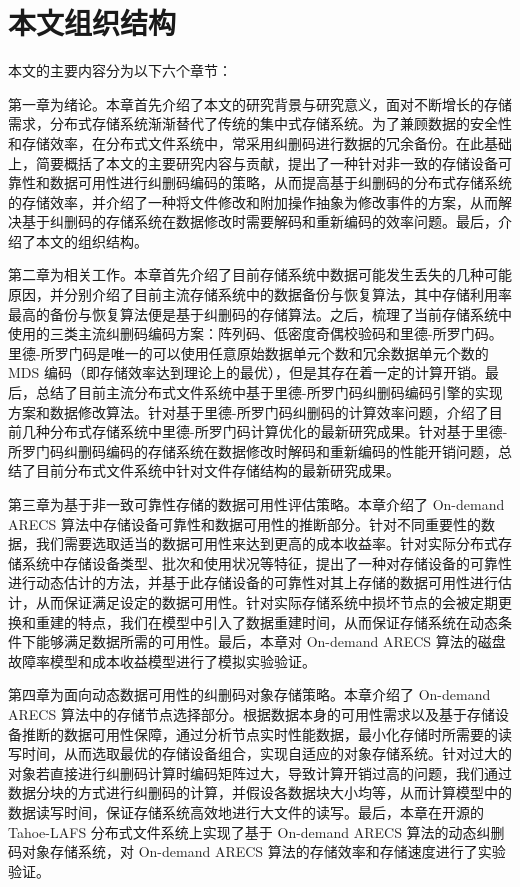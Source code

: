 \section{本文组织结构}
本文的主要内容分为以下六个章节：

第一章为绪论。本章首先介绍了本文的研究背景与研究意义，面对不断增长的存储需求，分布式存储系统渐渐替代了传统的集中式存储系统。为了兼顾数据的安全性和存储效率，在分布式文件系统中，常采用纠删码进行数据的冗余备份。在此基础上，简要概括了本文的主要研究内容与贡献，提出了一种针对非一致的存储设备可靠性和数据可用性进行纠删码编码的策略，从而提高基于纠删码的分布式存储系统的存储效率，并介绍了一种将文件修改和附加操作抽象为修改事件的方案，从而解决基于纠删码的存储系统在数据修改时需要解码和重新编码的效率问题。最后，介绍了本文的组织结构。

第二章为相关工作。本章首先介绍了目前存储系统中数据可能发生丢失的几种可能原因，并分别介绍了目前主流存储系统中的数据备份与恢复算法，其中存储利用率最高的备份与恢复算法便是基于纠删码的存储算法。之后，梳理了当前存储系统中使用的三类主流纠删码编码方案：阵列码、低密度奇偶校验码和里德-所罗门码。里德-所罗门码是唯一的可以使用任意原始数据单元个数和冗余数据单元个数的 MDS 编码（即存储效率达到理论上的最优），但是其存在着一定的计算开销。最后，总结了目前主流分布式文件系统中基于里德-所罗门码纠删码编码引擎的实现方案和数据修改算法。针对基于里德-所罗门码纠删码的计算效率问题，介绍了目前几种分布式存储系统中里德-所罗门码计算优化的最新研究成果。针对基于里德-所罗门码纠删码编码的存储系统在数据修改时解码和重新编码的性能开销问题，总结了目前分布式文件系统中针对文件存储结构的最新研究成果。

第三章为基于非一致可靠性存储的数据可用性评估策略。本章介绍了 On-demand ARECS 算法中存储设备可靠性和数据可用性的推断部分。针对不同重要性的数据，我们需要选取适当的数据可用性来达到更高的成本收益率。针对实际分布式存储系统中存储设备类型、批次和使用状况等特征，提出了一种对存储设备的可靠性进行动态估计的方法，并基于此存储设备的可靠性对其上存储的数据可用性进行估计，从而保证满足设定的数据可用性。针对实际存储系统中损坏节点的会被定期更换和重建的特点，我们在模型中引入了数据重建时间，从而保证存储系统在动态条件下能够满足数据所需的可用性。最后，本章对 On-demand ARECS 算法的磁盘故障率模型和成本收益模型进行了模拟实验验证。

第四章为面向动态数据可用性的纠删码对象存储策略。本章介绍了 On-demand ARECS 算法中的存储节点选择部分。根据数据本身的可用性需求以及基于存储设备推断的数据可用性保障，通过分析节点实时性能数据，最小化存储时所需要的读写时间，从而选取最优的存储设备组合，实现自适应的对象存储系统。针对过大的对象若直接进行纠删码计算时编码矩阵过大，导致计算开销过高的问题，我们通过数据分块的方式进行纠删码的计算，并假设各数据块大小均等，从而计算模型中的数据读写时间，保证存储系统高效地进行大文件的读写。最后，本章在开源的 Tahoe-LAFS 分布式文件系统上实现了基于 On-demand ARECS 算法的动态纠删码对象存储系统，对 On-demand ARECS 算法的存储效率和存储速度进行了实验验证。

